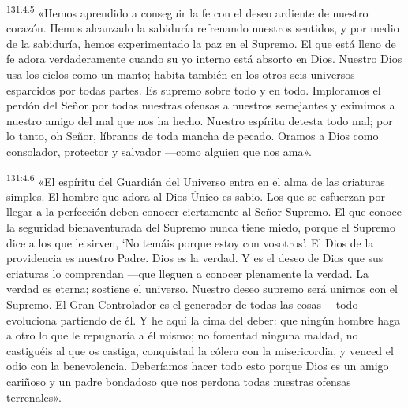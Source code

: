 \par
\textsuperscript{131:4.5} «Hemos aprendido a conseguir la fe con el deseo ardiente de nuestro corazón. Hemos alcanzado la sabiduría refrenando nuestros sentidos, y por medio de la sabiduría, hemos experimentado la paz en el Supremo. El que está lleno de fe adora verdaderamente cuando su yo interno está absorto en Dios. Nuestro Dios usa los cielos como un manto; habita también en los otros seis universos esparcidos por todas partes. Es supremo sobre todo y en todo. Imploramos el perdón del Señor por todas nuestras ofensas a nuestros semejantes y eximimos a nuestro amigo del mal que nos ha hecho. Nuestro espíritu detesta todo mal; por lo tanto, oh Señor, líbranos de toda mancha de pecado. Oramos a Dios como consolador, protector y salvador ---como alguien que nos ama».

\par
\textsuperscript{131:4.6} «El espíritu del Guardián del Universo entra en el alma de las criaturas simples. El hombre que adora al Dios Único es sabio. Los que se esfuerzan por llegar a la perfección deben conocer ciertamente al Señor Supremo. El que conoce la seguridad bienaventurada del Supremo nunca tiene miedo, porque el Supremo dice a los que le sirven, `No temáis porque estoy con vosotros'. El Dios de la providencia es nuestro Padre. Dios es la verdad. Y es el deseo de Dios que sus criaturas lo comprendan ---que lleguen a conocer plenamente la verdad. La verdad es eterna; sostiene el universo. Nuestro deseo supremo será unirnos con el Supremo. El Gran Controlador es el generador de todas las cosas--- todo evoluciona partiendo de él. Y he aquí la cima del deber: que ningún hombre haga a otro lo que le repugnaría a él mismo; no fomentad ninguna maldad, no castiguéis al que os castiga, conquistad la cólera con la misericordia, y venced el odio con la benevolencia. Deberíamos hacer todo esto porque Dios es un amigo cariñoso y un padre bondadoso que nos perdona todas nuestras ofensas terrenales».

